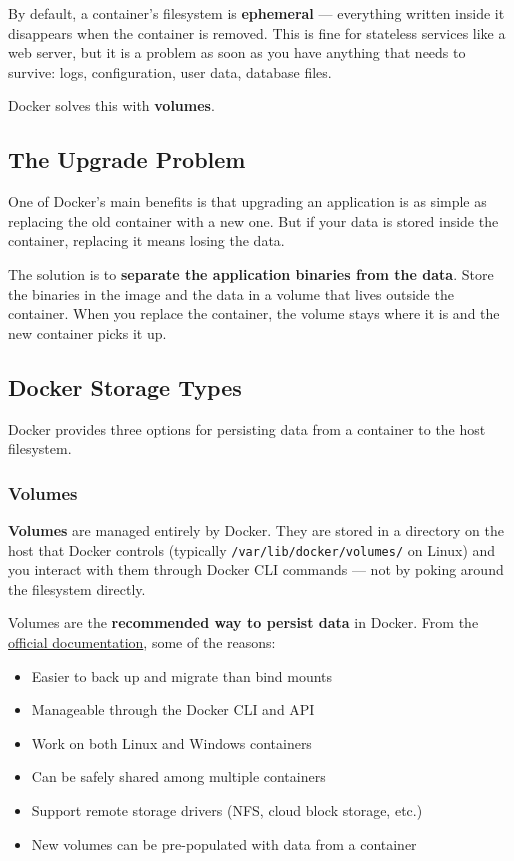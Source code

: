 \documentclass[11pt,american,a4paper,openany]{book}
\providecommand{\tightlist}{%
  \setlength{\itemsep}{2pt}\setlength{\parskip}{0pt}}
\begin{document}
By default, a container's filesystem is \textbf{ephemeral} ---
everything written inside it disappears when the container is removed.
This is fine for stateless services like a web server, but it is a
problem as soon as you have anything that needs to survive: logs,
configuration, user data, database files.

Docker solves this with \textbf{volumes}.

\subsection{The Upgrade Problem}\label{the-upgrade-problem}

One of Docker's main benefits is that upgrading an application is as
simple as replacing the old container with a new one. But if your data
is stored inside the container, replacing it means losing the data.

The solution is to \textbf{separate the application binaries from the
data}. Store the binaries in the image and the data in a volume that
lives outside the container. When you replace the container, the volume
stays where it is and the new container picks it up.

\subsection{Docker Storage Types}\label{docker-storage-types}

Docker provides three options for persisting data from a container to
the host filesystem.

\subsubsection{Volumes}\label{volumes}

\textbf{Volumes} are managed entirely by Docker. They are stored in a
directory on the host that Docker controls (typically
\texttt{/var/lib/docker/volumes/} on Linux) and you interact with them
through Docker CLI commands --- not by poking around the filesystem
directly.

Volumes are the \textbf{recommended way to persist data} in Docker. From
the \href{https://docs.docker.com/storage/volumes/}{official
documentation}, some of the reasons:

\begin{itemize}
\tightlist
\item
  Easier to back up and migrate than bind mounts
\item
  Manageable through the Docker CLI and API
\item
  Work on both Linux and Windows containers
\item
  Can be safely shared among multiple containers
\item
  Support remote storage drivers (NFS, cloud block storage, etc.)
\item
  New volumes can be pre-populated with data from a container
\end{itemize}
\end{document}
